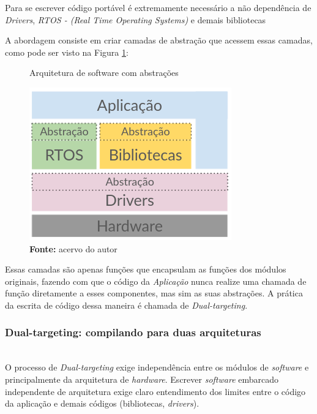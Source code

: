 \documentclass[times, twoside, watermark]{artigo}
\begin{document}
Para se escrever código portável é extremamente necessário a não dependência de
\textit{Drivers}, \textit{RTOS - (Real Time Operating Systems)} e demais bibliotecas

A abordagem consiste em criar camadas de abstração que acessem essas camadas, como
pode ser visto na Figura \ref{fig:arch-abs}: \hfill\\

\begin{figure}[H]
  \centering
  \caption{Arquitetura de software com abstrações}
  \includegraphics[width=0.9\linewidth]{images/arch-abs.png}
  \caption*{\newline\textbf{Fonte:} acervo do autor}
  \label{fig:arch-abs}
\end{figure}

Essas camadas são apenas funções que encapsulam as funções dos módulos originais,
fazendo com que o código da \textit{Aplicação} nunca realize uma chamada de função
diretamente a esses componentes, mas sim as suas abstrações. A prática da escrita de código dessa maneira é chamada de \textit{Dual-targeting}.

\subsubsection{Dual-targeting: compilando para duas arquiteturas}\hfill\\

O processo de \textit{Dual-targeting} exige independência
entre os módulos de \textit{software} e principalmente da arquitetura de 
\textit{hardware}.
Escrever \textit{software} embarcado independente de arquitetura exige claro
entendimento dos limites entre o código da aplicação e demais códigos (bibliotecas, 
\textit{drivers}).
\end{document}
